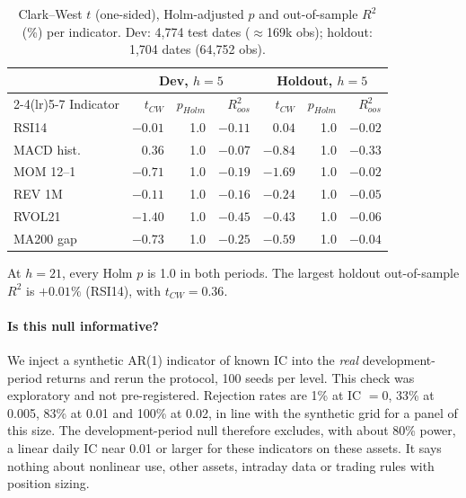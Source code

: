 \documentclass[11pt]{article}
\begin{document}
\begin{table}[h]\centering\small
\caption{Clark--West $t$ (one-sided), Holm-adjusted $p$ and out-of-sample $R^2$ (\%) per indicator. Dev: 4{,}774 test dates ($\approx$169k obs); holdout: 1{,}704 dates (64{,}752 obs).}\label{tab:real}
\begin{tabular}{l rrr rrr}\toprule
& \multicolumn{3}{c}{Dev, $h=5$} & \multicolumn{3}{c}{Holdout, $h=5$}\\\cmidrule(lr){2-4}\cmidrule(lr){5-7}
Indicator & $t_{CW}$ & $p_{Holm}$ & $R^2_{oos}$ & $t_{CW}$ & $p_{Holm}$ & $R^2_{oos}$\\\midrule
RSI14 & $-0.01$ & 1.0 & $-0.11$ & $0.04$ & 1.0 & $-0.02$\\
MACD hist. & $0.36$ & 1.0 & $-0.07$ & $-0.84$ & 1.0 & $-0.33$\\
MOM 12--1 & $-0.71$ & 1.0 & $-0.19$ & $-1.69$ & 1.0 & $-0.02$\\
REV 1M & $-0.11$ & 1.0 & $-0.16$ & $-0.24$ & 1.0 & $-0.05$\\
RVOL21 & $-1.40$ & 1.0 & $-0.45$ & $-0.43$ & 1.0 & $-0.06$\\
MA200 gap & $-0.73$ & 1.0 & $-0.25$ & $-0.59$ & 1.0 & $-0.04$\\\bottomrule
\end{tabular}\end{table}

At $h=21$, every Holm $p$ is 1.0 in both periods. The largest holdout out-of-sample $R^2$ is $+0.01\%$ (RSI14), with $t_{CW}=0.36$.

\paragraph{Is this null informative?} We inject a synthetic AR(1) indicator of known IC into the \emph{real} development-period returns and rerun the protocol, 100 seeds per level. This check was exploratory and not pre-registered. Rejection rates are 1\% at IC $=0$, 33\% at 0.005, 83\% at 0.01 and 100\% at 0.02, in line with the synthetic grid for a panel of this size. The development-period null therefore excludes, with about 80\% power, a linear daily IC near 0.01 or larger for these indicators on these assets. It says nothing about nonlinear use, other assets, intraday data or trading rules with position sizing.
\end{document}
